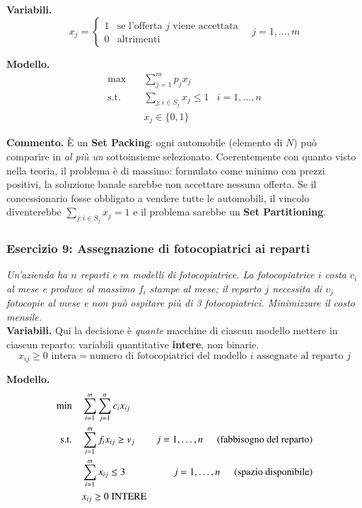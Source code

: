 \documentclass[12pt]{extarticle} %
\begin{document}
\noindent\textbf{Variabili.}
\[
x_j = \begin{cases} 1 & \text{se l'offerta } j \text{ viene accettata}\\ 0 & \text{altrimenti}\end{cases} \quad j=1,\dots,m
\]

\noindent\textbf{Modello.}
\[
\begin{aligned}
\max \quad & \sum_{j=1}^m p_j x_j \\
\text{s.t.} \quad & \sum_{j : i \in S_j} x_j \le 1 & i=1,\dots,n \\
& x_j \in \{0,1\}
\end{aligned}
\]

\noindent\textbf{Commento.} È un \textbf{Set Packing}: ogni automobile (elemento di $N$) può comparire in \textit{al più un} sottoinsieme selezionato. Coerentemente con quanto visto nella teoria, il problema è di massimo: formulato come minimo con prezzi positivi, la soluzione banale sarebbe non accettare nessuna offerta. Se il concessionario fosse obbligato a vendere tutte le automobili, il vincolo diventerebbe $\sum_{j: i \in S_j} x_j = 1$ e il problema sarebbe un \textbf{Set Partitioning}.

\subsubsection{Esercizio 9: Assegnazione di fotocopiatrici ai reparti}
\textit{Un'azienda ha $n$ reparti e $m$ modelli di fotocopiatrice. La fotocopiatrice $i$ costa $c_i$ al mese e produce al massimo $f_i$ stampe al mese; il reparto $j$ necessita di $v_j$ fotocopie al mese e non può ospitare più di 3 fotocopiatrici. Minimizzare il costo mensile.}\\

\noindent\textbf{Variabili.} Qui la decisione è \textit{quante} macchine di ciascun modello mettere in ciascun reparto: variabili quantitative \textbf{intere}, non binarie.
\[
x_{ij} \ge 0 \text{ intera} = \text{numero di fotocopiatrici del modello } i \text{ assegnate al reparto } j
\]

\noindent\textbf{Modello.}
\[
\begin{aligned}
\min \quad & \sum_{i=1}^m \sum_{j=1}^n c_i x_{ij} \\
\text{s.t.} \quad & \sum_{i=1}^m f_i x_{ij} \ge v_j & j=1,\dots,n \hspace{0.5cm}\text{(fabbisogno del reparto)}\\
& \sum_{i=1}^m x_{ij} \le 3 & j=1,\dots,n \hspace{0.5cm}\text{(spazio disponibile)}\\
& x_{ij} \ge 0 \text{ INTERE}
\end{aligned}
\]
\end{document}
